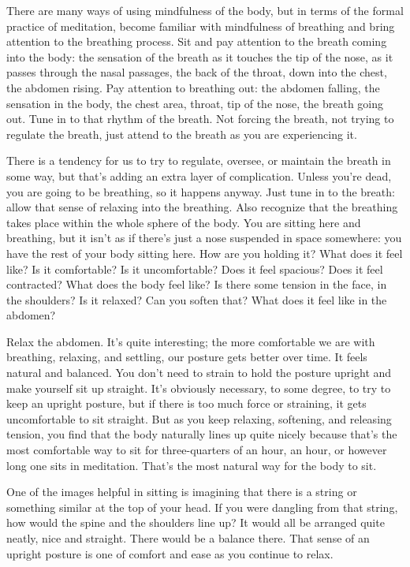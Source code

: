 There are many ways of using mindfulness of the body, but in terms of
the formal practice of meditation, become familiar with mindfulness of
breathing and bring attention to the breathing process. Sit and pay
attention to the breath coming into the body: the sensation of the
breath as it touches the tip of the nose, as it passes through the nasal
passages, the back of the throat, down into the chest, the abdomen
rising. Pay attention to breathing out: the abdomen falling, the
sensation in the body, the chest area, throat, tip of the nose, the
breath going out. Tune in to that rhythm of the breath. Not forcing the
breath, not trying to regulate the breath, just attend to the breath as
you are experiencing it.

There is a tendency for us to try to regulate, oversee, or maintain the
breath in some way, but that’s adding an extra layer of complication.
Unless you’re dead, you are going to be breathing, so it happens anyway.
Just tune in to the breath: allow that sense of relaxing into the
breathing. Also recognize that the breathing takes place within the
whole sphere of the body. You are sitting here and breathing, but it
isn’t as if there’s just a nose suspended in space somewhere: you have
the rest of your body sitting here. How are you holding it? What does it
feel like? Is it comfortable? Is it uncomfortable? Does it feel
spacious? Does it feel contracted? What does the body feel like? Is
there some tension in the face, in the shoulders? Is it relaxed? Can you
soften that? What does it feel like in the abdomen?

Relax the abdomen. It’s quite interesting; the more comfortable we are
with breathing, relaxing, and settling, our posture gets better over
time. It feels natural and balanced. You don’t need to strain to hold
the posture upright and make yourself sit up straight. It’s obviously
necessary, to some degree, to try to keep an upright posture, but if
there is too much force or straining, it gets uncomfortable to sit
straight. But as you keep relaxing, softening, and releasing tension,
you find that the body naturally lines up quite nicely because that’s
the most comfortable way to sit for three-quarters of an hour, an hour,
or however long one sits in meditation. That’s the most natural way for
the body to sit.

One of the images helpful in sitting is imagining that there is a string
or something similar at the top of your head. If you were dangling from
that string, how would the spine and the shoulders line up? It would all
be arranged quite neatly, nice and straight. There would be a balance
there. That sense of an upright posture is one of comfort and ease as
you continue to relax.

